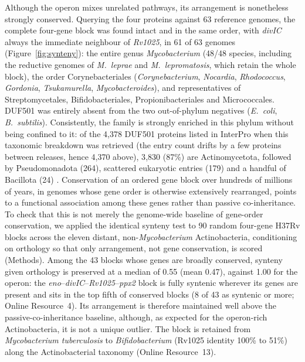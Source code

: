 \documentclass[11pt,a4paper]{article}
\newcommand{\mtb}{\textit{Mycobacterium tuberculosis}}
\begin{document}
Although the operon mixes unrelated pathways, its arrangement is nonetheless strongly conserved. Querying the four proteins against 63 reference genomes, the complete four-gene block was found intact and in the same order, with \textit{divIC} always the immediate neighbour of \textit{Rv1025}, in 61 of 63 genomes (Figure~\ref{fig:synteny}): the entire genus \textit{Mycobacterium} (48/48 species, including the reductive genomes of \textit{M.\ leprae} and \textit{M.\ lepromatosis}, which retain the whole block), the order Corynebacteriales (\textit{Corynebacterium}, \textit{Nocardia}, \textit{Rhodococcus}, \textit{Gordonia}, \textit{Tsukamurella}, \textit{Mycobacteroides}), and representatives of Streptomycetales, Bifidobacteriales, Propionibacteriales and Micrococcales. DUF501 was entirely absent from the two out-of-phylum negatives (\textit{E.\ coli}, \textit{B.\ subtilis}). Consistently, the family is strongly enriched in this phylum without being confined to it: of the 4{,}378 DUF501 proteins listed in InterPro when this taxonomic breakdown was retrieved (the entry count drifts by a few proteins between releases, hence 4{,}370 above), 3{,}830 (87\%) are Actinomycetota, followed by Pseudomonadota (264), scattered eukaryotic entries (179) and a handful of Bacillota (24) \citep{paysanlafosse2023interpro}. Conservation of an ordered gene block over hundreds of millions of years, in genomes whose gene order is otherwise extensively rearranged, points to a functional association among these genes rather than passive co-inheritance. To check that this is not merely the genome-wide baseline of gene-order conservation, we applied the identical synteny test to 90 random four-gene H37Rv blocks across the eleven distant, non-\textit{Mycobacterium} Actinobacteria, conditioning on orthology so that only arrangement, not gene conservation, is scored (Methods). Among the 43 blocks whose genes are broadly conserved, synteny given orthology is preserved at a median of 0.55 (mean 0.47), against 1.00 for the operon: the \textit{eno}--\textit{divIC}--\textit{Rv1025}--\textit{ppx2} block is fully syntenic wherever its genes are present and sits in the top fifth of conserved blocks (8 of 43 as syntenic or more; Online Resource~4). Its arrangement is therefore maintained well above the passive-co-inheritance baseline, although, as expected for the operon-rich Actinobacteria, it is not a unique outlier. The block is retained from \mtb{} to \textit{Bifidobacterium} (Rv1025 identity 100\% to 51\%) along the Actinobacterial taxonomy (Online Resource~13).
\end{document}
